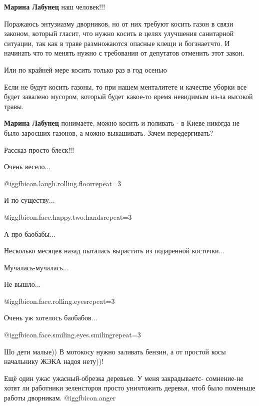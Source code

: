 \begin{itemize}
\begin{itemize}
\textbf{Марина Лабунец} наш человек!!!

\end{itemize} %


Поражаюсь энтузиазму дворников, но от них требуют косить газон в связи законом,
который гласит, что нужно косить в целях улучшения санитарной ситуации, так как
в траве размножаются опасные клещи и богзнаетчто. И начинать что то менять
нужно с требования от депутатов отменить этот закон.

\begin{itemize} %
Или по крайней мере косить только раз в год осенью


Если не будут косить газоны, то при нашем менталитете и качестве уборки все
будет завалено мусором, который будет какое-то время невидимым из-за высокой
травы.


\textbf{Марина Лабунец} понимаете, можно косить и поливать - в Киеве никогда не было заросших газонов, а можно выкашивать. Зачем передергивать?
\end{itemize} %

Рассказ просто блеск!!!

Очень весело...

@igg{fbicon.laugh.rolling.floor}{repeat=3} 

И по существу...

@igg{fbicon.face.happy.two.hands}{repeat=3} 

А про баобабы...

Несколько месяцев назад пыталась вырастить из подаренной косточки...

Мучалась-мучалась...

Не вышло...

@igg{fbicon.face.rolling.eyes}{repeat=3} 

Очень уж хотелось баобабов...

@igg{fbicon.face.smiling.eyes.smiling}{repeat=3} 

Шо дети малые))
В мотокосу нужно заливать бензин, а от простой косы начальнику ЖЭКА надоя нету))!


Ещё один ужас ужасный-обрезка деревьев. У меня закрадываетс- сомнение-не хотят
ли работники зеленстороя просто уничтожить деревья, чтоб было поменьше работы
дворникам. @igg{fbicon.anger} 



\end{itemize}
